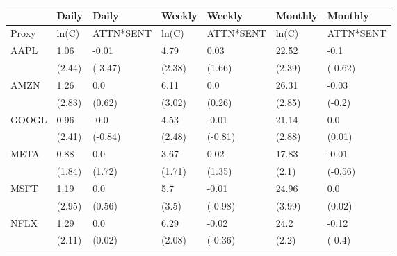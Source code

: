 \begin{tabular}{lllllll}
\toprule
{} &   Daily &      Daily &  Weekly &     Weekly & Monthly &    Monthly \\
\midrule
Proxy &   ln(C) &  ATTN*SENT &   ln(C) &  ATTN*SENT &   ln(C) &  ATTN*SENT \\
AAPL  &    1.06 &      -0.01 &    4.79 &       0.03 &   22.52 &       -0.1 \\
      &  (2.44) &    (-3.47) &  (2.38) &     (1.66) &  (2.39) &    (-0.62) \\
AMZN  &    1.26 &        0.0 &    6.11 &        0.0 &   26.31 &      -0.03 \\
      &  (2.83) &     (0.62) &  (3.02) &     (0.26) &  (2.85) &     (-0.2) \\
GOOGL &    0.96 &       -0.0 &    4.53 &      -0.01 &   21.14 &        0.0 \\
      &  (2.41) &    (-0.84) &  (2.48) &    (-0.81) &  (2.88) &     (0.01) \\
META  &    0.88 &        0.0 &    3.67 &       0.02 &   17.83 &      -0.01 \\
      &  (1.84) &     (1.72) &  (1.71) &     (1.35) &   (2.1) &    (-0.56) \\
MSFT  &    1.19 &        0.0 &     5.7 &      -0.01 &   24.96 &        0.0 \\
      &  (2.95) &     (0.56) &   (3.5) &    (-0.98) &  (3.99) &     (0.02) \\
NFLX  &    1.29 &        0.0 &    6.29 &      -0.02 &    24.2 &      -0.12 \\
      &  (2.11) &     (0.02) &  (2.08) &    (-0.36) &   (2.2) &     (-0.4) \\
\bottomrule
\end{tabular}
